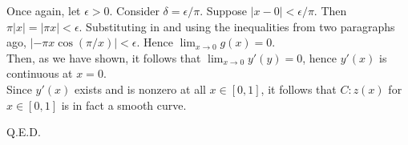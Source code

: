 \documentclass{article}
\theoremstyle{definition}
\newcommand{\cs}[1]{\color{blue}{#1}\normalcolor}
\begin{document}
Once again, let $\epsilon > 0$. Consider $\delta = \epsilon/\pi$. Suppose $|x-0| < \epsilon/\pi$. Then $\pi|x| = |\pi x| < \epsilon$. Substituting in and using the inequalities from two paragraphs ago, $|-\pi x \cos(\pi/x)| < \epsilon$. Hence $\lim_{x\rightarrow 0}g(x) = 0$.\\

Then, as we have shown, it follows that $\lim_{x\rightarrow 0}y'(y) = 0$, hence $y'(x)$ is continuous at $x =0$.\\

Since $y'(x)$ exists and is nonzero at all $x\in [0,1]$, it follows that $C:z(x)$ for $x\in [0,1]$ is in fact a smooth curve.

Q.E.D.

\cs{Existence of $z'(0)$ is still a question here. 9.5/10}

\cs{14.5/15}
\end{document}
